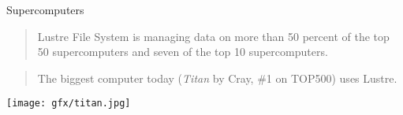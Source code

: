 \begin{frame}{Supercomputers}
    \begin{quote}
        Lustre File System is managing data on more than 50 percent of the top
        50 supercomputers and seven of the top 10 supercomputers.

        \hspace*{}
    \end{quote}

    \vspace{0.5cm}

    \begin{quote}
        The biggest computer today (\emph{Titan} by Cray, \#1 on TOP500) uses Lustre.
    \end{quote}

    \center\texttt{[image: gfx/titan.jpg]}\cite{titan-image}
\end{frame}
